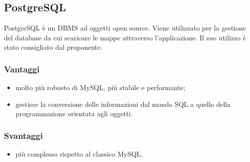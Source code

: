 \documentclass[../SpecificaTecnica.tex]{subfiles}
\begin{document}
	\subsection{PostgreSQL}
		PostgreSQL è un DBMS ad oggetti open source. Viene utilizzato per la gestione del database da cui scaricare le mappe attraverso l'applicazione. Il suo utilizzo è stato consigliato dal proponente. 
		\subsubsection{Vantaggi}
			\begin{itemize}
				\item molto più robusto di MySQL, più stabile e performante;
				\item gestisce la conversione delle informazioni dal mondo SQL a quello della programmazione orientata agli oggetti.
			\end{itemize}
		\subsubsection{Svantaggi}
			\begin{itemize}
				\item più complesso rispetto al classico MySQL.
			\end{itemize}
			
\end{document}

